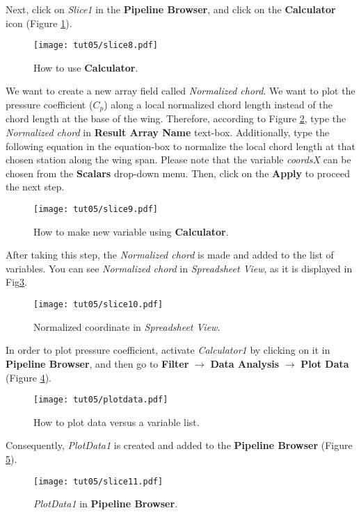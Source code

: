 Next, click on \textit{Slice1} in the \textbf{Pipeline Browser}, and click on the \textbf{Calculator} icon (Figure \ref{fig5:slice8}).
\begin{figure}[htbp]
    \centering
    \texttt{[image: tut05/slice8.pdf]}
    \caption{How to use \textbf{Calculator}.}
    \label{fig5:slice8}
\end{figure}
We want to create a new array field called \textit{Normalized chord}. We want to plot the pressure coefficient ($C_p$) along a local normalized chord length instead of the chord length at the base of the wing. Therefore, according to Figure \ref{fig5:slice9}, type the \textit{Normalized chord} in \textbf{Result Array Name} text-box. Additionally, type the following equation in the equation-box to normalize the local chord length at that chosen station along the wing span. Please note that the variable \textit{coordsX} can be chosen from the \textbf{Scalars} drop-down menu. Then, click on the \textbf{Apply} to proceed the next step.
\begin{figure}[htbp]
    \centering
    \texttt{[image: tut05/slice9.pdf]}
    \caption{How to make new variable using \textbf{Calculator}.}
    \label{fig5:slice9}
\end{figure}
After taking this step, the \textit{Normalized chord} is made and added to the list of variables. You can see \textit{Normalized chord} in \textit{Spreadsheet View}, as it is displayed in Fig\ref{fig5:slice10}.
\begin{figure}[htbp]
    \centering
    \texttt{[image: tut05/slice10.pdf]}
    \caption{Normalized coordinate in \textit{Spreadsheet View}.}
    \label{fig5:slice10}
\end{figure}

In order to plot pressure coefficient, activate \textit{Calculator1} by clicking on it in \textbf{Pipeline Browser}, and then go to \textbf{Filter} $\rightarrow$ \textbf{Data Analysis} $\rightarrow$ \textbf{Plot Data} (Figure \ref{fig5:plotdata5}).
\begin{figure}[htbp]
    \centering
    \texttt{[image: tut05/plotdata.pdf]}
    \caption{How to plot data versus a variable list.}
    \label{fig5:plotdata5}
\end{figure}
Consequently, \textit{PlotData1} is created and added to the \textbf{Pipeline Browser} (Figure \ref{fig5:slice11}).
\begin{figure}[htbp]
    \centering
    \texttt{[image: tut05/slice11.pdf]}
    \caption{\textit{PlotData1} in \textbf{Pipeline Browser}.}
    \label{fig5:slice11}
\end{figure}

